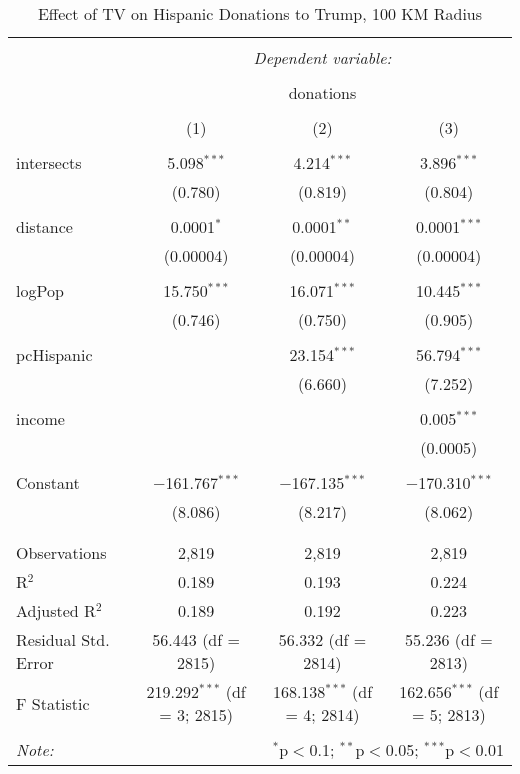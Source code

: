 
\begin{table}[!htbp] \centering 
  \caption{Effect of TV on Hispanic Donations to Trump, 100 KM Radius} 
  \label{} 
\begin{tabular}{@{\extracolsep{5pt}}lccc} 
\\[-1.8ex]\hline 
\hline \\[-1.8ex] 
 & \multicolumn{3}{c}{\textit{Dependent variable:}} \\ 
\cline{2-4} 
\\[-1.8ex] & \multicolumn{3}{c}{donations} \\ 
\\[-1.8ex] & (1) & (2) & (3)\\ 
\hline \\[-1.8ex] 
 intersects & 5.098$^{***}$ & 4.214$^{***}$ & 3.896$^{***}$ \\ 
  & (0.780) & (0.819) & (0.804) \\ 
  & & & \\ 
 distance & 0.0001$^{*}$ & 0.0001$^{**}$ & 0.0001$^{***}$ \\ 
  & (0.00004) & (0.00004) & (0.00004) \\ 
  & & & \\ 
 logPop & 15.750$^{***}$ & 16.071$^{***}$ & 10.445$^{***}$ \\ 
  & (0.746) & (0.750) & (0.905) \\ 
  & & & \\ 
 pcHispanic &  & 23.154$^{***}$ & 56.794$^{***}$ \\ 
  &  & (6.660) & (7.252) \\ 
  & & & \\ 
 income &  &  & 0.005$^{***}$ \\ 
  &  &  & (0.0005) \\ 
  & & & \\ 
 Constant & $-$161.767$^{***}$ & $-$167.135$^{***}$ & $-$170.310$^{***}$ \\ 
  & (8.086) & (8.217) & (8.062) \\ 
  & & & \\ 
\hline \\[-1.8ex] 
Observations & 2,819 & 2,819 & 2,819 \\ 
R$^{2}$ & 0.189 & 0.193 & 0.224 \\ 
Adjusted R$^{2}$ & 0.189 & 0.192 & 0.223 \\ 
Residual Std. Error & 56.443 (df = 2815) & 56.332 (df = 2814) & 55.236 (df = 2813) \\ 
F Statistic & 219.292$^{***}$ (df = 3; 2815) & 168.138$^{***}$ (df = 4; 2814) & 162.656$^{***}$ (df = 5; 2813) \\ 
\hline 
\hline \\[-1.8ex] 
\textit{Note:}  & \multicolumn{3}{r}{$^{*}$p$<$0.1; $^{**}$p$<$0.05; $^{***}$p$<$0.01} \\ 
\end{tabular} 
\end{table} 
